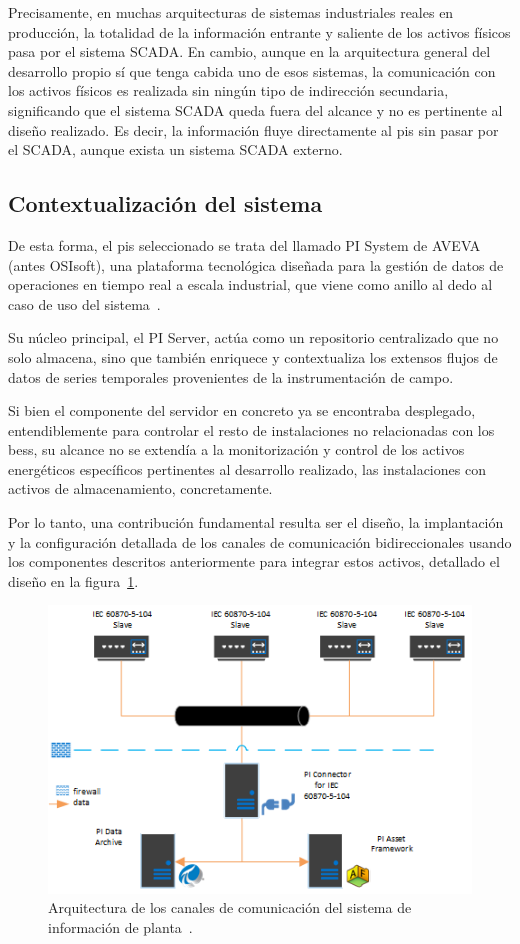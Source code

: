Precisamente, en muchas arquitecturas de sistemas industriales reales en producción, la totalidad de la información entrante y saliente de los activos físicos pasa por el sistema SCADA\@. En cambio, aunque en la arquitectura general del desarrollo propio sí que tenga cabida uno de esos sistemas, la comunicación con los activos físicos es realizada sin ningún tipo de indirección secundaria, significando que el sistema SCADA queda fuera del alcance y no es pertinente al diseño realizado. Es decir, la información fluye directamente al \gls{pis} sin pasar por el SCADA\@, aunque exista un sistema SCADA externo.

\subsection{Contextualización del sistema}%
\label{makereference3.4.1}

De esta forma, el \gls{pis} seleccionado se trata del llamado PI System de AVEVA (antes OSIsoft), una plataforma tecnológica diseñada para la gestión de datos de operaciones en tiempo real a escala industrial, que viene como anillo al dedo al caso de uso del sistema~\cite{aveva2025aveva}.

Su núcleo principal, el PI Server, actúa como un repositorio centralizado que no solo almacena, sino que también enriquece y contextualiza los extensos flujos de datos de series temporales provenientes de la instrumentación de campo.

Si bien el componente del servidor en concreto ya se encontraba desplegado, entendiblemente para controlar el resto de instalaciones no relacionadas con los \gls{bess}, su alcance no se extendía a la monitorización y control de los activos energéticos específicos pertinentes al desarrollo realizado, las instalaciones con activos de almacenamiento, concretamente.

Por lo tanto, una contribución fundamental resulta ser el diseño, la implantación y la configuración detallada de los canales de comunicación bidireccionales usando los componentes descritos anteriormente para integrar estos activos, detallado el diseño en la figura~\ref{fig:sistema-de-informacion-de-planta}.

\begin{figure}
  \centering
  \includegraphics[width=0.5\linewidth]{figures/sistema-de-informacion-de-planta.png}
  \caption[Arquitectura del sistema de información de planta.]{Arquitectura de los canales de comunicación del sistema de información de planta~\cite{aveva2025aveva}.}%
  \label{fig:sistema-de-informacion-de-planta}
\end{figure}

